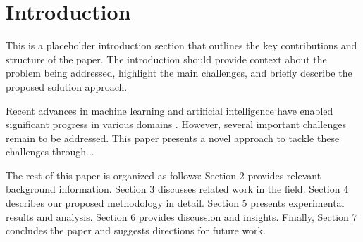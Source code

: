 \section{Introduction}

This is a placeholder introduction section that outlines the key contributions and structure of the paper. The introduction should provide context about the problem being addressed, highlight the main challenges, and briefly describe the proposed solution approach.

Recent advances in machine learning and artificial intelligence have enabled significant progress in various domains \cite{assran2025vjepa2selfsupervisedvideo}. However, several important challenges remain to be addressed. This paper presents a novel approach to tackle these challenges through...

The rest of this paper is organized as follows: Section 2 provides relevant background information. Section 3 discusses related work in the field. Section 4 describes our proposed methodology in detail. Section 5 presents experimental results and analysis. Section 6 provides discussion and insights. Finally, Section 7 concludes the paper and suggests directions for future work.
